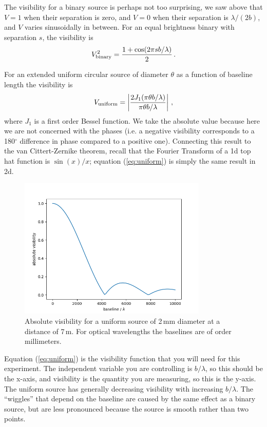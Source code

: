 \documentclass[11pt]{article}
\begin{document}
The visibility for a binary source is perhaps not too surprising, we saw above that $V=1$ when their separation is zero, and $V=0$ when their separation is $\lambda/(2b)$, and $V$ varies sinusoidally in between. For an equal brightness binary with separation $s$, the visibility is
\begin{equation}
    V^2_{\rm binary} = \frac{1 + \cos ( 2 \pi s b / \lambda )}{2} \, .
\end{equation}

For an extended uniform circular source of diameter $\theta$ as a function of baseline length the visibility is
\begin{equation}\label{eq:uniform}
    V_{\rm uniform} =  \left\vert \frac{2 J_1(\pi \theta b / \lambda)}{\pi \theta b / \lambda} \right\vert \, ,
\end{equation}
where $J_1$ is a first order Bessel function. We take the absolute value because here we are not concerned with the phases (i.e. a negative visibility corresponds to a 180$^\circ$ difference in phase compared to a positive one). Connecting this result to the van Cittert-Zernike theorem, recall that the Fourier Transform of a 1d top hat function is $\sin(x)/x$; equation (\ref{eq:uniform}) is simply the same result in 2d.

\begin{figure}
    \centering
    \includegraphics[width=0.8\textwidth]{doc/uniform_vis.png}
    \caption{Absolute visibility for a uniform source of 2\,mm diameter at a distance of 7\,m. For optical wavelengths the baselines are of order millimeters.}
    \label{fig:uniformvis}
\end{figure}

Equation (\ref{eq:uniform}) is the visibility function that you will need for this experiment. The independent variable you are controlling is $b/\lambda$, so this should be the x-axis, and visibility is the quantity you are measuring, so this is the y-axis. The uniform source has generally decreasing visibility with increasing $b/\lambda$. The ``wiggles'' that depend on the baseline are caused by the same effect as a binary source, but are less pronounced because the source is smooth rather than two points.
\end{document}
